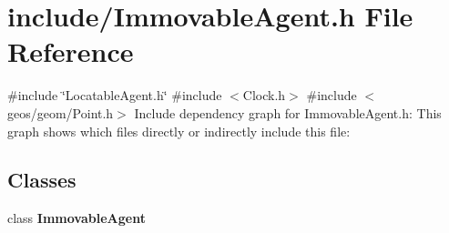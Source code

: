 \section{include/\+Immovable\+Agent.h File Reference}
\label{_immovable_agent_8h}
{\ttfamily \#include \char`\"{}Locatable\+Agent.\+h\char`\"{}}\newline
{\ttfamily \#include $<$Clock.\+h$>$}\newline
{\ttfamily \#include $<$geos/geom/\+Point.\+h$>$}\newline
Include dependency graph for Immovable\+Agent.\+h\+:
This graph shows which files directly or indirectly include this file\+:
\subsection*{Classes}
\begin{DoxyCompactItemize}
\item 
class \textbf{ Immovable\+Agent}
\end{DoxyCompactItemize}
